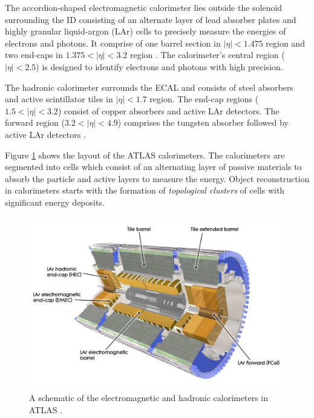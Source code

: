 The accordion-shaped electromagnetic calorimeter lies outside the solenoid surrounding the ID consisting of an alternate layer of lead absorber plates and highly granular liquid-argon (LAr) cells to precisely measure the energies of electrons and photons. It comprise of one barrel section in $|\eta| < 1.475$ region and two end-caps in $1.375 < |\eta| < 3.2$ region \cite{ATLAS_ECAL}. The calorimeter's central region ($|\eta| < 2.5$) is designed to identify electrons and photons with high precision.

The hadronic calorimeter surrounds the ECAL and consists of steel absorbers and active scintillator tiles in $|\eta| < 1.7$ region. The end-cap regions ($1.5 < |\eta| < 3.2$) consist of copper absorbers and active LAr detectors. The forward region ($3.2 < |\eta| < 4.9$) comprises the tungsten absorber followed by active LAr detectors \cite{ATLAS_HCAL}. 

Figure \ref{fig:ATLAS_Cals} shows the layout of the ATLAS calorimeters. The calorimeters are segmented into cells which consist of an alternating layer of passive materials to absorb the particle and active layers to measure the energy. Object reconstruction in calorimeters starts with the formation of \textit{topological clusters} of cells with significant energy deposits.

\begin{figure}[!htbp]
    \centering
    \includegraphics[width=.98\linewidth]{figures/LHC/ATLAS_CALO.jpeg}
    \caption{ A schematic of the electromagnetic and hadronic calorimeters in ATLAS \cite{ATLAS}.\label{fig:ATLAS_Cals}}
\end{figure}

